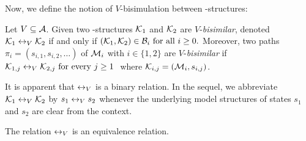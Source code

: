 \documentclass{article}
\begin{document}
Now, we define the notion of $V$-bisimulation between \MPK-structures:
\begin{definition}[$V$-bisimulation]
  \label{def:V-bisimulation}
   Let $V\subseteq\cal A$. Given   two \MPK-structures ${\cal K}_1$ and ${\cal K}_2$ are $V$-{\em bisimilar},  denoted ${\cal K}_1 \leftrightarrow_V {\cal K}_2$
 if and only if $ ({\cal K}_1,{\cal K}_2)\in {{\cal B}_i}\mbox{ for all }i\ge 0.$ Moreover, two paths $\pi_i=(s_{i,1},s_{i,2},\ldots)$ of ${\cal M}_i$ with $i\in \{1,2\}$
 are $V$-{\em bisimilar} if
$ {\cal K}_{1,j} \leftrightarrow_V {\cal K}_{2,j}\mbox { for every $j\ge 1$ }$
 where ${\cal K}_{i,j}=({\cal M}_i,s_{i,j})$.

\end{definition}



It is  apparent that $\leftrightarrow_V$ is a binary relation.
 In the sequel, we abbreviate ${\cal K}_1 \leftrightarrow_V {\cal K}_2$
 by $s_1 \leftrightarrow_V s_2 $
 whenever the underlying model structures of states $s_1$ and $s_2$ are clear from the context.%
\begin{lemma}\label{lem:equive}
  The relation $\leftrightarrow_V$ is an equivalence relation.
\end{lemma}
\end{document}
